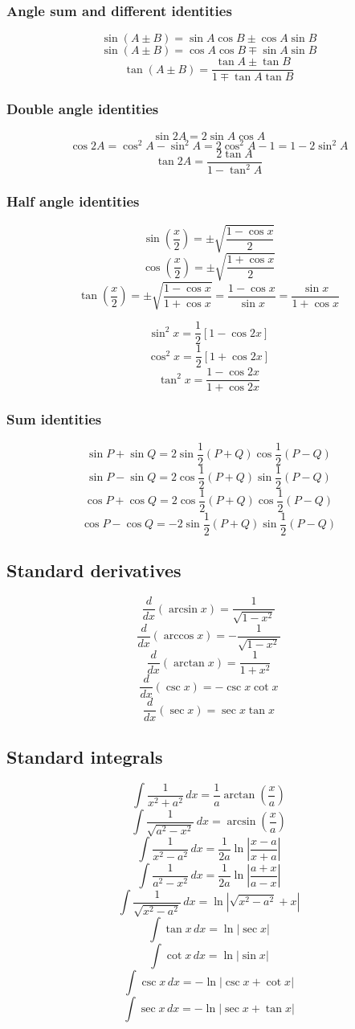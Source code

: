 \documentclass[11pt]{article}
\begin{document}
\subsubsection{Angle sum and different identities}
\label{sec:org4d63c67}
\[\sin(A \pm B) = \sin A \cos B \pm \cos A \sin B\]
\[\sin(A \pm B) = \cos A \cos B \mp \sin A \sin B\]
\[\tan(A \pm B) = \frac{\tan A \pm \tan B}{1 \mp \tan A \tan B}\]
\subsubsection{Double angle identities}
\label{sec:orgb548546}
\[\sin 2A = 2 \sin A \cos A\]
\[\cos 2A = \cos^2 A - \sin^2 A = 2 \cos^2 A - 1 = 1 - 2 \sin^2 A\]
\[\tan 2A = \frac{2 \tan A}{1 - \tan^2 A}\]
\subsubsection{Half angle identities}
\label{sec:orga79edcc}
\[\sin \left(\frac{x}{2} \right) = \pm \sqrt{\frac{1 - \cos x}{2}}\]
\[\cos \left(\frac{x}{2} \right) = \pm \sqrt{\frac{1 + \cos x}{2}}\]
\[\tan \left(\frac{x}{2} \right) = \pm \sqrt{\frac{1 - \cos x}{1 + \cos x}} = \frac{1 - \cos x}{\sin x} = \frac{\sin x}{1 + \cos x}\]

\[\sin^2 x = \frac{1}{2} \left[1 - \cos 2x \right]\]
\[\cos^2 x = \frac{1}{2} \left[1 + \cos 2x \right]\]
\[\tan^2 x = \frac{1 - \cos 2x}{1 + \cos 2x}\]
\subsubsection{Sum identities}
\label{sec:org9aa9ee3}
\[\sin P + \sin Q = 2 \sin \frac{1}{2}(P + Q) \cos \frac{1}{2}(P - Q)\]
\[\sin P - \sin Q = 2 \cos \frac{1}{2}(P + Q) \sin \frac{1}{2}(P - Q)\]
\[\cos P + \cos Q = 2 \cos \frac{1}{2}(P + Q) \cos \frac{1}{2}(P - Q)\]
\[\cos P - \cos Q = - 2 \sin \frac{1}{2}(P + Q) \sin \frac{1}{2}(P - Q)\]
\subsection{Standard derivatives}
\label{sec:orgaaf0f2e}
\[\frac{d}{dx} \left(\arcsin x \right) = \frac{1}{\sqrt{1 - x^2}}\]
\[\frac{d}{dx} \left(\arccos x \right) = - \frac{1}{\sqrt{1 - x^2}}\]
\[\frac{d}{dx} \left(\arctan x \right) = \frac{1}{1 + x^2}\]
\[\frac{d}{dx} \left(\csc x \right) = - \csc x \cot x\]
\[\frac{d}{dx} \left(\sec x \right) = \sec x \tan x\]
\subsection{Standard integrals}
\label{sec:org9c44934}
\[\int \frac{1}{x^2 + a^2} \, dx = \frac{1}{a} \arctan \left(\frac{x}{a} \right)\]
\[\int \frac{1}{\sqrt{a^2 - x^2}} \, dx = \arcsin \left(\frac{x}{a} \right)\]
\[\int \frac{1}{x^2 - a^2} \, dx = \frac{1}{2a} \ln \left|\frac{x - a}{x + a} \right|\]
\[\int \frac{1}{a^2 - x^2} \, dx = \frac{1}{2a} \ln \left|\frac{a + x}{a - x} \right|\]
\[\int \frac{1}{\sqrt{x^2 - a^2}} \, dx = \ln \left|\sqrt{x^2 - a^2} + x \right|\]
\[\int \tan x \, dx = \ln |\sec x|\]
\[\int \cot x \, dx = \ln |\sin x|\]
\[\int \csc x \, dx = - \ln |\csc x + \cot x|\]
\[\int \sec x \, dx = - \ln |\sec x + \tan x|\]
\end{document}
